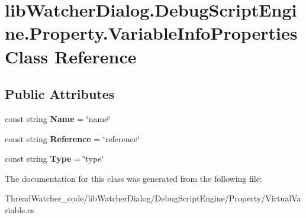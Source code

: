 \hypertarget{classlib_watcher_dialog_1_1_debug_script_engine_1_1_property_1_1_variable_info_properties}{\section{lib\+Watcher\+Dialog.\+Debug\+Script\+Engine.\+Property.\+Variable\+Info\+Properties Class Reference}
\label{classlib_watcher_dialog_1_1_debug_script_engine_1_1_property_1_1_variable_info_properties}
}
\subsection*{Public Attributes}
\begin{DoxyCompactItemize}
\item 
\hypertarget{classlib_watcher_dialog_1_1_debug_script_engine_1_1_property_1_1_variable_info_properties_ac5929039762c025fa7e9c49e75c81f45}{const string {\bfseries Name} = \char`\"{}name\char`\"{}}\label{classlib_watcher_dialog_1_1_debug_script_engine_1_1_property_1_1_variable_info_properties_ac5929039762c025fa7e9c49e75c81f45}

\item 
\hypertarget{classlib_watcher_dialog_1_1_debug_script_engine_1_1_property_1_1_variable_info_properties_a486f07695ac473acbc8e2743fdeb8c30}{const string {\bfseries Reference} = \char`\"{}reference\char`\"{}}\label{classlib_watcher_dialog_1_1_debug_script_engine_1_1_property_1_1_variable_info_properties_a486f07695ac473acbc8e2743fdeb8c30}

\item 
\hypertarget{classlib_watcher_dialog_1_1_debug_script_engine_1_1_property_1_1_variable_info_properties_ae9de687a842771cd4508862b6e6a236a}{const string {\bfseries Type} = \char`\"{}type\char`\"{}}\label{classlib_watcher_dialog_1_1_debug_script_engine_1_1_property_1_1_variable_info_properties_ae9de687a842771cd4508862b6e6a236a}

\end{DoxyCompactItemize}


The documentation for this class was generated from the following file\+:\begin{DoxyCompactItemize}
\item 
Thread\+Watcher\+\_\+code/lib\+Watcher\+Dialog/\+Debug\+Script\+Engine/\+Property/Virtual\+Variable.\+cs\end{DoxyCompactItemize}
